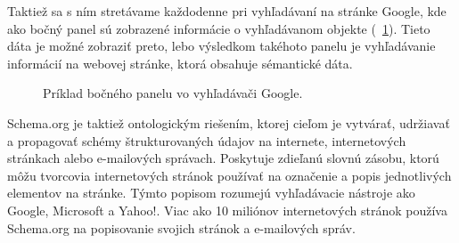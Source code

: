 \documentclass[12pt, a4paper, oneside]{book}
\begin{document}

Taktiež sa s ním stretávame každodenne pri vyhľadávaní na stránke Google, kde ako bočný panel sú zobrazené informácie o vyhľadávanom objekte (~\ref{fig:semantic_web}). Tieto dáta je možné zobraziť preto, lebo výsledkom takéhoto panelu je vyhľadávanie informácií na webovej stránke, ktorá obsahuje sémantické dáta.

\begin{figure}[h]
\label{fig:semantic_web}
\caption{Príklad bočného panelu vo vyhľadávači Google.}
\end{figure}

Schema.org \cite{schemaOrg} je taktiež ontologickým riešením, ktorej cieľom je vytvárať, udržiavať a propagovať schémy štrukturovaných údajov na internete, internetových stránkach alebo e-mailových správach. Poskytuje zdieľanú slovnú zásobu, ktorú môžu tvorcovia internetových stránok používať na označenie a popis jednotlivých elementov na stránke. Týmto popisom rozumejú vyhľadávacie nástroje ako Google, Microsoft a Yahoo!. Viac ako 10 miliónov internetových stránok používa Schema.org na popisovanie svojich stránok a e-mailových správ.
\end{document}
